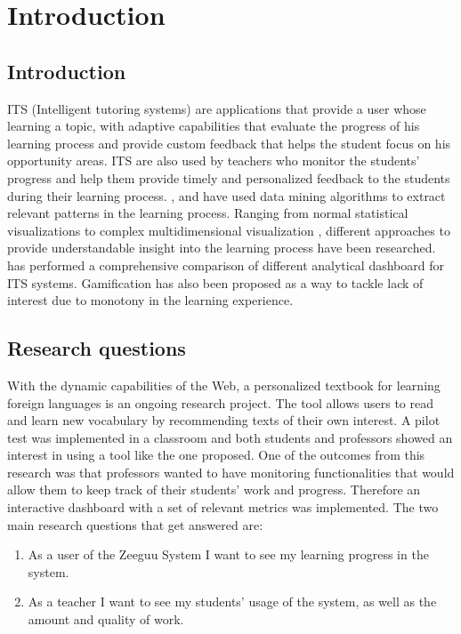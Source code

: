 \chapter{Introduction}\label{ch:introduction}

\section{Introduction}
ITS (Intelligent tutoring systems) are applications that provide a user whose learning a topic, with adaptive capabilities that evaluate the progress of his learning process and provide custom feedback that helps the student focus on his opportunity areas.
ITS are also used by teachers who monitor the students’ progress and help them provide timely and personalized feedback to the students during their learning process.
\cite{Jugo2014}, \cite{Romero2008} and \cite{Dogan2009} have used data mining algorithms to extract relevant patterns in the learning process. Ranging from normal statistical visualizations \cite{Romero2008} to complex multidimensional visualization \cite{Dogan2009}, different approaches to provide understandable insight into the learning process have been researched. \citeauthor{Verbert2013}\cite{Verbert2013} has performed a comprehensive comparison of different analytical dashboard for ITS systems. Gamification \cite{Gonzalez2014} has also been proposed as a way to tackle lack of interest due to monotony in the learning experience.

\section{Research questions}
With the dynamic capabilities of the Web, a personalized textbook for learning foreign languages \cite{Mircea2018} is an ongoing research project. The tool allows users to read and learn new vocabulary by recommending texts of their own interest. A pilot test was implemented in a classroom and both students and professors showed an interest in using a tool like the one proposed. One of the outcomes from this research was that professors wanted to have monitoring functionalities that would allow them to keep track of their students' work and progress.
Therefore an interactive dashboard with a set of relevant metrics was implemented.
The two main research questions that get answered are:

\begin{enumerate}
\item As a user of the Zeeguu System I want to see my learning progress in the system.
\item As a teacher I want to see my students' usage of the system, as well as the amount and quality of work.
\end{enumerate}


